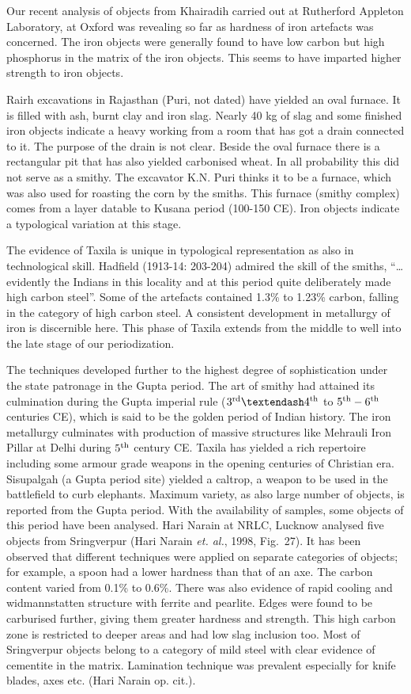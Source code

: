 Our recent analysis of objects from Khairadih carried out at Rutherford Appleton Laboratory, at Oxford was revealing so far as hardness of iron artefacts was concerned. The iron objects were generally found to have low carbon but high phosphorus in the matrix of the iron objects. This seems to have imparted higher strength to iron objects.  

Rairh excavations in Rajasthan (Puri, not dated) have yielded an oval furnace. It is filled with ash, burnt clay and iron slag. Nearly 40 kg of slag and some finished iron objects indicate a heavy working from a room that has got a drain connected to it. The purpose of the drain is not clear. Beside the oval furnace there is a rectangular pit that has also yielded carbonised wheat. In all probability this did not serve as a smithy. The excavator K.N. Puri thinks it to be a furnace, which was also used for roasting the corn by the smiths. This furnace (smithy complex) comes from a layer datable to Kusana period (100-150 CE). Iron objects indicate a typological variation at this stage.

The evidence of Taxila is unique in typological representation as also in technological skill. Hadfield (1913-14: 203-204) admired the skill of the smiths, “…evidently the Indians in this locality and at this period quite deliberately made high carbon steel”. Some of the artefacts contained 1.3\% to 1.23\% carbon, falling in the category of high carbon steel. A consistent development in metallurgy of iron is discernible here. This phase of Taxila extends from the middle to well into the late stage of our periodization. 

The techniques developed further to the highest degree of sophistication under the state patronage in the Gupta period. The art of smithy had attained its culmination during the Gupta imperial rule ($3^{\rm rd} – 4^{\rm th}$ to $5^{\rm th} - 6^{\rm th}$ centuries CE), which is said to be the golden period of Indian history. The iron metallurgy culminates with production of massive structures like Mehrauli Iron Pillar at Delhi during $5^{\rm th}$ century CE. Taxila has yielded a rich repertoire including some armour grade weapons in the opening centuries of Christian era. Sisupalgah (a Gupta period site) yielded a caltrop, a weapon to be used in the battlefield to curb elephants. Maximum variety, as also large number of objects, is reported from the Gupta period. With the availability of samples, some objects of this period have been analysed. Hari Narain at NRLC, Lucknow analysed five objects from Sringverpur (Hari Narain {\it et. al.}, 1998, Fig.~27). It has been observed that different techniques were applied on separate categories of objects; for example, a spoon had a lower hardness than that of an axe. The carbon content varied from 0.1\% to 0.6\%. There was also evidence of rapid cooling and widmannstatten structure with ferrite and pearlite. Edges were found to be carburised further, giving them greater hardness and strength. This high carbon zone is restricted to deeper areas and had low slag inclusion too. Most of Sringverpur objects belong to a category of mild steel with clear evidence of cementite in the matrix. Lamination technique was prevalent especially for knife blades, axes etc. (Hari Narain op. cit.). 


